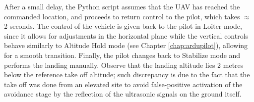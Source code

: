 After a small delay, the Python script assumes that the UAV has reached the commanded location, and proceeds to return control to the pilot, which takes $\approx$2 seconds.
The control of the vehicle is given back to the pilot in Loiter mode, since it allows for adjustments in the horizontal plane while the vertical controls behave similarly to Altitude Hold mode (see Chapter \ref{chap:ardupilot}), allowing for a smooth transition.
Finally, the pilot changes back to Stabilize mode and performs the landing manually.
Observe that the landing altitude lies 2 metres below the reference take off altitude; such discrepancy is due to the fact that the take off was done from an elevated site to avoid false-positive activation of the avoidance stage by the reflection of the ultrasonic signals on the ground itself.

